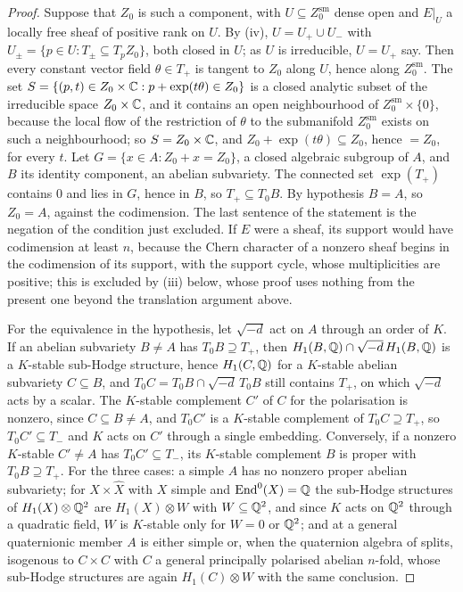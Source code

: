 \begin{proof}
Suppose that $Z_{0}$ is such a component, with $U\subseteq Z_{0}^{\mathrm{sm}}$
dense open and $E|_{U}$ a locally free sheaf of positive rank on $U$. By
(iv), $U=U_{+}\cup U_{-}$ with
$U_{\pm}=\{p\in U:T_{\pm}\subseteq T_{p}Z_{0}\}$, both closed in $U$; as $U$
is irreducible, $U=U_{+}$ say. Then every constant vector field
$\theta\in T_{+}$ is tangent to $Z_{0}$ along $U$, hence along
$Z_{0}^{\mathrm{sm}}$. The set
$S=\{(p,t)\in Z_{0}\times\mathbb{C}:p+\exp(t\theta)\in Z_{0}\}$ is a closed
analytic subset of the irreducible space $Z_{0}\times\mathbb{C}$, and it contains
an open neighbourhood of $Z_{0}^{\mathrm{sm}}\times\{0\}$, because the local
flow of the restriction of $\theta$ to the submanifold $Z_{0}^{\mathrm{sm}}$
exists on such a neighbourhood; so $S=Z_{0}\times\mathbb{C}$, and
$Z_{0}+\exp(t\theta)\subseteq Z_{0}$, hence $=Z_{0}$, for every $t$. Let
$G=\{x\in A:Z_{0}+x=Z_{0}\}$, a closed algebraic subgroup of $A$, and $B$
its identity component, an abelian subvariety. The connected set
$\exp(T_{+})$ contains $0$ and lies in $G$, hence in $B$, so
$T_{+}\subseteq T_{0}B$. By hypothesis $B=A$, so $Z_{0}=A$, against the
codimension. The last sentence of the statement is the negation of the
condition just excluded. If $E$ were a sheaf, its support would have
codimension at least $n$, because the Chern character of a nonzero sheaf
begins in the codimension of its support, with the support cycle, whose
multiplicities are positive; this is excluded by (iii)
below, whose proof uses nothing from the present one beyond the translation
argument above.

For the equivalence in the hypothesis, let $\sqrt{-d}$ act on $A$ through
an order of $K$. If an abelian subvariety $B\ne A$ has
$T_{0}B\supseteq T_{+}$, then $H_{1}(B,\mathbb{Q})\cap\sqrt{-d}\,H_{1}(B,\mathbb{Q})$ is a
$K$-stable sub-Hodge structure, hence $H_{1}(C,\mathbb{Q})$ for a $K$-stable abelian
subvariety $C\subseteq B$, and $T_{0}C=T_{0}B\cap\sqrt{-d}\,T_{0}B$ still
contains $T_{+}$, on which $\sqrt{-d}$ acts by a scalar. The $K$-stable
complement $C'$ of $C$ for the polarisation is nonzero, since
$C\subseteq B\ne A$, and $T_{0}C'$ is a $K$-stable complement of
$T_{0}C\supseteq T_{+}$, so $T_{0}C'\subseteq T_{-}$ and $K$ acts on $C'$
through a single embedding. Conversely, if a nonzero $K$-stable $C'\ne A$ has
$T_{0}C'\subseteq T_{-}$, its $K$-stable complement $B$ is proper with
$T_{0}B\supseteq T_{+}$. For the three cases: a simple $A$ has no nonzero
proper abelian subvariety; for $X\times\widehat X$ with $X$ simple and
$\operatorname{End}^{0}(X)=\mathbb{Q}$ the sub-Hodge structures of $H_{1}(X)\otimes\mathbb{Q}^{2}$ are
$H_{1}(X)\otimes W$ with $W\subseteq\mathbb{Q}^{2}$, and since $K$ acts on
$\mathbb{Q}^{2}$ through a quadratic field, $W$ is $K$-stable only for $W=0$ or
$\mathbb{Q}^{2}$; and at a general quaternionic member $A$ is either simple or, when
the quaternion algebra of \cite[Setup~15.24]{paperI} splits, isogenous to $C\times C$
with $C$ a general
principally polarised abelian $n$-fold, whose sub-Hodge structures are again
$H_{1}(C)\otimes W$ with the same conclusion.
\end{proof}

